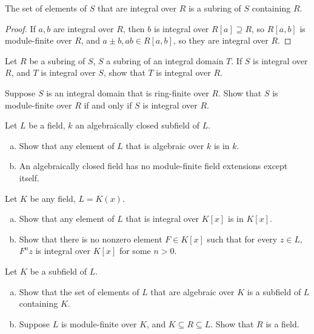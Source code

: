 \documentclass[10pt]{mypackage}
\begin{document}
\begin{corollary}
  The set of elements of $S$ that are integral over $R$ is a subring of $S$ containing $R$.
\end{corollary}
\begin{proof}
  If $a,b$ are integral over $R$, then $b$ is integral over $R\left[ a \right]\supseteq R$, so $R\left[ a,b \right]$ is module-finite over $R$, and $a\pm b,ab\in R\left[ a,b \right]$, so they are integral over $R$.
\end{proof}
\begin{exercise}[Exercise 1.46]
  Let $R$ be a subring of $S$, $S$ a subring of an integral domain $T$. If $S$ is integral over $R$, and $T$ is integral over $S$, show that $T$ is integral over $R$.
\end{exercise}
\begin{exercise}[Exercise 1.47]
  Suppose $S$ is an integral domain that is ring-finite over $R$. Show that $S$ is module-finite over $R$ if and only if $S$ is integral over $R$.
\end{exercise}
\begin{exercise}[Exercise 1.48]
  Let $L$ be a field, $k$ an algebraically closed subfield of $L$.
  \begin{enumerate}[(a)]
    \item Show that any element of $L$ that is algebraic over $k$ is in $k$.
    \item An algebraically closed field has no module-finite field extensions except itself.
  \end{enumerate}
\end{exercise}
\begin{exercise}[Exercise 1.49]
  Let $K$ be any field, $L=  K(x)$.
  \begin{enumerate}[(a)]
    \item Show that any element of $L$ that is integral over $K\left[ x \right]$ is in $K\left[ x \right]$.
    \item Show that there is no nonzero element $F\in K\left[ x \right]$ such that for every $z\in L$, $F^{n}z$ is integral over $K\left[ x \right]$ for some $n > 0$.
  \end{enumerate}
\end{exercise}
\begin{exercise}[Exercise 1.50]
  Let $K$ be a subfield of $L$.
  \begin{enumerate}[(a)]
    \item Show that the set of elements of $L$ that are algebraic over $K$ is a subfield of $L$ containing $K$.
    \item Suppose $L$ is module-finite over $K$, and $K\subseteq R\subseteq L$. Show that $R$ is a field.
  \end{enumerate}
\end{exercise}
\end{document}
